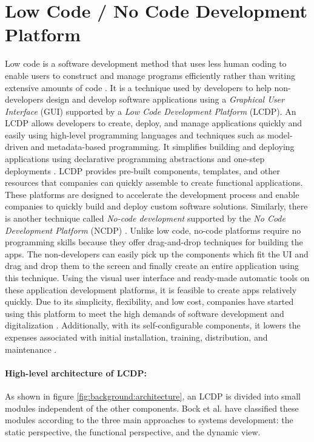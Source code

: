 
\section{Low Code / No Code Development Platform}
\label{background:section:lowcode}
Low code is a software development method that uses less human coding to enable users to construct and manage programs efficiently rather than writing extensive amounts of code \cite{article:nocode:sahina}.
It is a technique used by developers to help non-developers design and develop software applications using a \textit{Graphical User Interface} (GUI) supported by a \textit{Low Code Development Platform} (LCDP).
An LCDP allows developers to create, deploy, and manage applications quickly and easily using high-level programming languages and techniques such as model-driven and metadata-based programming. 
It simplifies building and deploying applications using declarative programming abstractions and one-step deployments \cite{misc:lowcode:platforms}.
LCDP provides pre-built components, templates, and other resources that companies can quickly assemble to create functional applications.
These platforms are designed to accelerate the development process and enable companies to quickly build and deploy custom software solutions.
Similarly, there is another technique called \textit{No-code development} supported by the \textit{No Code Development Platform} (NCDP) \cite{article:nocode:miller}.
Unlike low code, no-code platforms require no programming skills because they offer drag-and-drop techniques for building the apps.
The non-developers can easily pick up the components which fit the UI and drag and drop them to the screen and finally create an entire application using this technique.
Using the visual user interface and ready-made automatic tools on these application development platforms, it is feasible to create apps relatively quickly. 
Due to its simplicity, flexibility, and low cost, companies have started using this platform to meet the high demands of software development and digitalization \cite{article:nocode:sahina}.
Additionally, with its self-configurable components, it lowers the expenses associated with initial installation, training, distribution, and maintenance \cite{article:nocode:sanchi}.

\paragraph*{High-level architecture of LCDP:}
As shown in figure \ref{fig:background:architecture}, an LCDP is divided into small modules independent of the other components.
Bock et al. \cite{misc:lowcode:platforms} have classified these modules according to the three main approaches to systems development: the static perspective, the functional perspective, and the dynamic view.

